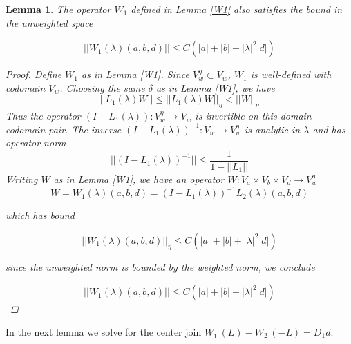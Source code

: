 \documentclass[12pt]{article}
\newtheorem{lemma}{Lemma}
\begin{document}
\begin{lemma}\label{W1unweighted}
The operator $W_1$ defined in Lemma \ref{W1} also satisfies the bound in the unweighted space

\[
||W_1(\lambda)(a,b,d)|| \leq C ( |a| + |b| + |\lambda|^2 |d|)
\]

\begin{proof}
Define $W_1$ as in Lemma \ref{W1}. Since $V_w^\eta \subset V_w$, $W_1$ is well-defined with codomain $V_w$. Choosing the same $\delta$ as in Lemma \ref{W1}, we have
\[
||L_1(\lambda)W|| \leq ||L_1(\lambda)W||_\eta < ||W||_\eta
\]
Thus the operator $(I - L_1(\lambda)): V_w^\eta \rightarrow V_w$ is invertible on this domain-codomain pair. The inverse $(I - L_1(\lambda))^{-1}: V_w \rightarrow V_w^\eta$ is analytic in $\lambda$ and has operator norm 
\[
||(I - L_1(\lambda))^{-1}|| \leq \frac{1}{1 - ||L_1||}
\]
Writing $W$ as in Lemma \ref{W1}, we have an operator $W: V_a \times V_b \times V_d \rightarrow V_w^\eta$
\[
W = W_1(\lambda)(a,b,d) = (I - L_1(\lambda))^{-1} L_2(\lambda)(a,b,d)
\]

which has bound

\[
||W_1(\lambda)(a,b,d)||_\eta \leq C ( |a| + |b| + |\lambda|^2 |d| )
\]

since the unweighted norm is bounded by the weighted norm, we conclude 

\[
||W_1(\lambda)(a,b,d)|| \leq C ( |a| + |b| + |\lambda|^2 |d| )
\]

\end{proof}
\end{lemma}

In the next lemma we solve for the center join $W_1^+(L) - W_2^-(-L) = D_1 d$.
\end{document}
